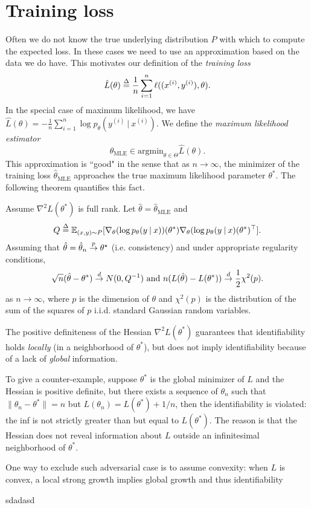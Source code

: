 \documentclass[]{subook}
\newcommand\defn{\stackrel{\mathclap{\tiny\Delta}}{=}}
\newcommand\E{\mathbb{E}}
\begin{document}
\section{Training loss}
Often we do not know the true underlying distribution $P$ with which to compute the expected loss. In these cases we need to use an approximation based on the data we do have. This motivates our definition of the \textit{training loss} $$\hat{L}(\theta) \defn \frac1n \sum_{i=1}^n \ell((x^{(i)},y^{(i)}),\theta).$$ In the special case of maximum likelihood, we have $\hat{L}(\theta) = -\frac1n \sum_{i=1}^n \log p_\theta(y^{(i)}\: | \:x^{(i)})$. We define the \textit{maximum likelihood estimator} $$\hat{\theta}_{\mathrm{MLE}} \in \mathrm{argmin}_{\theta\in\Theta} \hat{L}(\theta).$$ This approximation is ``good" in the sense that as $n\rightarrow\infty$, the minimizer of the training loss $\hat{\theta}_\mathrm{MLE}$ approaches the true maximum likelihood parameter $\theta^*$. The following theorem quantifies this fact.
\begin{theorem} \label{mle}
  Assume $\nabla^2 L(\theta^*)$ is full rank. Let $\hat{\theta} = \hat{\theta}_{\mathrm{MLE}}$ and $$Q \defn \E_{(x,y)\sim P}[\nabla_\theta(\log p_\theta(y\: | \: x))(\theta^*) \nabla_\theta(\log p_\theta(y\: | \: x)(\theta^*)^\top].$$
  Assuming that $\hat{\theta}=\hat{\theta}_n\stackrel{\tiny p}{\rightarrow}\theta^\star$ (i.e. consistency) and under appropriate regularity conditions,  $$\sqrt{n}(\hat{\theta}-\theta^*)\stackrel{\tiny d}{\rightarrow} N(0, Q^{-1}) \textup{ and } n(L(\hat{\theta}) - L(\theta^*))\stackrel{\tiny d}{\rightarrow} \frac12 \chi^2(p).$$ as $n\rightarrow\infty$, where $p$ is the dimension of $\theta$ and $\chi^2(p)$ is the distribution of the sum of the squares of $p$ i.i.d. standard Gaussian random variables.
\end{theorem}

\begin{remark}
    The positive definiteness of the Hessian $\nabla^2 L(\theta^\ast)$ guarantees that identifiability holds \emph{locally} (in a neighborhood of $\theta^\ast$), but does not imply identifiability because of a lack of \emph{global} information. 

To give a counter-example, suppose $\theta^\ast$ is the global minimizer of $L$ and the Hessian is positive definite, but there exists a sequence of $\theta_n$ such that $\|\theta_n-\theta^\ast\|=n$ but $L(\theta_n)=L(\theta^\ast)+1/n$, then the identifiability is violated: the inf is not strictly greater than but equal to $L(\theta^\ast)$. The reason is that the Hessian does not reveal information about $L$ outside an infinitesimal neighborhood of $\theta^\ast$.

One way to exclude such adversarial case is to assume convexity: when $L$ is convex, a local strong growth implies global growth and thus identifiability
\end{remark}


\begin{example}[fasd]
    sdadasd
\end{example}
\end{document}
